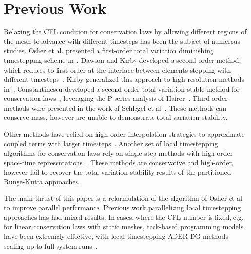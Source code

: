 \section{Previous Work}
\label{sec:prev}

Relaxing the CFL condition for conservation laws by allowing different regions of the mesh to advance with different timesteps has been the subject of numerous studies. Osher et al. presented a first-order total variation diminishing timestepping scheme in~\cite{Osher1983}. Dawson and Kirby developed a second order method, which reduces to first order at the interface between elements stepping with different timesteps~\cite{Dawson2000}. Kirby generalized this approach to high resolution methods in~\cite{Kirby2003}. Constantinescu developed a second order total variation stable method for conservation laws~\cite{Constantinescu2007}, leveraging the P-series analysis of Hairer~\cite{Hairer1981}. Third order methods were presented in the work of Schlegel et al~\cite{Schlegel2009}. These methods can conserve mass, however are unable to demonstrate total variation stability.

Other methods have relied on high-order interpolation strategies to approximate coupled terms with larger timesteps~\cite{Krivodonova2010, Gupta2016, Hoang2019}. Another set of local timestepping algorithms for conservation laws rely on single step methods with high-order space-time representations~\cite{Loercher2007,Dumbser2007,Taube2009}. These methods are conservative and high-order, however fail to recover the total variation stability results of the partitioned Runge-Kutta approaches.

The main thrust of this paper is a reformulation of the algorithm of Osher et al~\cite{Osher1983} to improve parallel performance. Previous work parallelizing local timestepping approaches has had mixed results. In cases, where the CFL number is fixed, e.g. for linear conservation laws with static meshes, task-based programming models have been extremely effective, with local timestepping ADER-DG methods scaling up to full system runs~\cite{Breuer2016,Uphoff2017}. 

